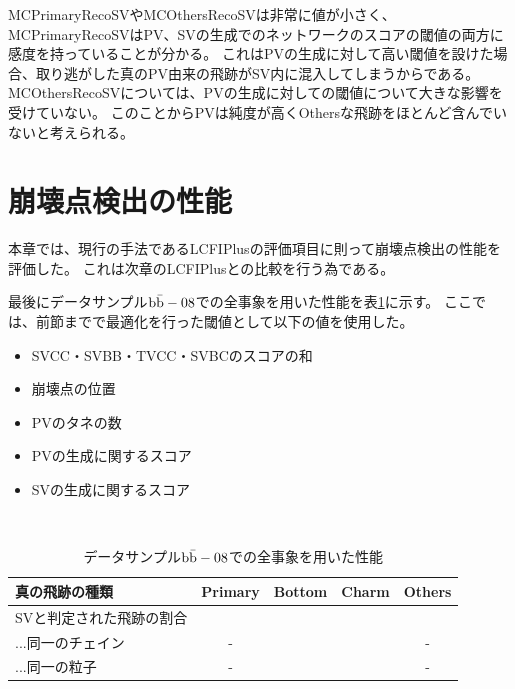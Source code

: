 MCPrimaryRecoSVやMCOthersRecoSVは非常に値が小さく、MCPrimaryRecoSVはPV、SVの生成でのネットワークのスコアの閾値の両方に感度を持っていることが分かる。
これはPVの生成に対して高い閾値を設けた場合、取り逃がした真のPV由来の飛跡がSV内に混入してしまうからである。
MCOthersRecoSVについては、PVの生成に対しての閾値について大きな影響を受けていない。
このことからPVは純度が高くOthersな飛跡をほとんど含んでいないと考えられる。

\section{崩壊点検出の性能} \label{VFDL:SummaryofVFDL}

本章では、現行の手法であるLCFIPlusの評価項目に則って崩壊点検出の性能を評価した。
これは次章のLCFIPlusとの比較を行う為である。

最後にデータサンプル$\rm b\bar{b}-08$での全事象を用いた性能を表\ref{PerformanceofAllEvents}に示す。
ここでは、前節までで最適化を行った閾値として以下の値を使用した。

\begin{itemize}
 \item SVCC・SVBB・TVCC・SVBCのスコアの和
 \item 崩壊点の位置
 \item PVのタネの数
 \item PVの生成に関するスコア
 \item SVの生成に関するスコア
\end{itemize}

\begin{table}[htb]
 \centering
　\small
  \begin{tabular}{l c c c c} \hline
    真の飛跡の種類 & Primary & Bottom & Charm & Others\\ \hline
    SVと判定された飛跡の割合 &  &  &  &\\
    ...同一のチェイン & - &  &  & - \\
    ...同一の粒子 & - &  &  & - \\\hline
  \end{tabular}
  \caption{データサンプル$\rm b\bar{b}-08$での全事象を用いた性能}
  \label{PerformanceofAllEvents}
\end{table}

















